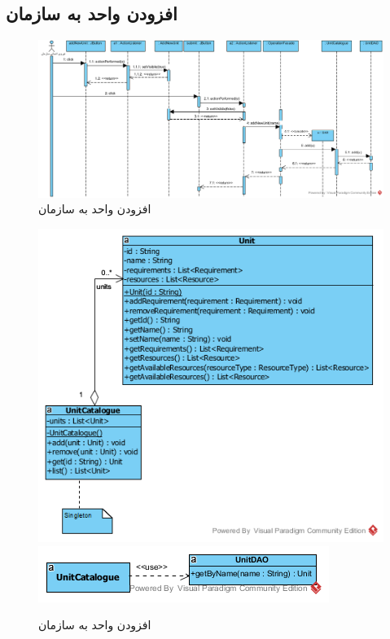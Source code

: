 \begin{landscape}
\newpage
\section{افزودن واحد به سازمان}
\begin{figure}[H]
	\centering
	\includegraphics[scale=0.7]{img/sequence-design/AddUnitToOrganization}
	\caption{افزودن واحد به سازمان}
\end{figure}
\begin{figure}[H]
	\centering
	\includegraphics[scale=0.6]{img/sequence-design/AddUnitToOrganizationC}
	\includegraphics[scale=0.6]{img/sequence-design/AddUnitToOrganizationD}
	\caption{افزودن واحد به سازمان}
\end{figure}


\end{landscape}
